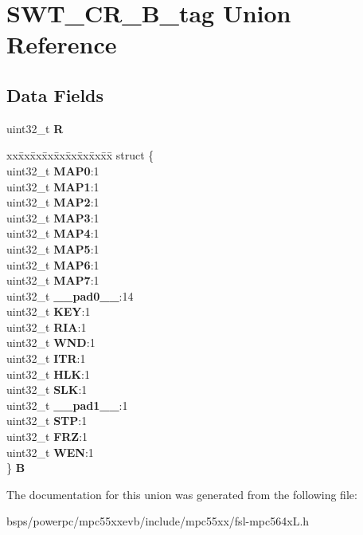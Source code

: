 \hypertarget{unionSWT__CR__32B__tag}{}\section{S\+W\+T\+\_\+\+C\+R\+\_\+B\+\_\+tag Union Reference}
\label{unionSWT__CR__32B__tag}
\subsection*{Data Fields}
\begin{DoxyCompactItemize}
\item 
\mbox{\label{unionSWT__CR__32B__tag_aab82e5accfd13bc4b1583a7394783085}} 
uint32\+\_\+t {\bfseries R}
\item 
\mbox{\label{unionSWT__CR__32B__tag_a6fef1e4d8547604577e510ce1edbcf1a}} 
\begin{tabbing}
xx\=xx\=xx\=xx\=xx\=xx\=xx\=xx\=xx\=\kill
struct \{\\
\>uint32\_t {\bfseries MAP0}:1\\
\>uint32\_t {\bfseries MAP1}:1\\
\>uint32\_t {\bfseries MAP2}:1\\
\>uint32\_t {\bfseries MAP3}:1\\
\>uint32\_t {\bfseries MAP4}:1\\
\>uint32\_t {\bfseries MAP5}:1\\
\>uint32\_t {\bfseries MAP6}:1\\
\>uint32\_t {\bfseries MAP7}:1\\
\>uint32\_t {\bfseries \_\_pad0\_\_}:14\\
\>uint32\_t {\bfseries KEY}:1\\
\>uint32\_t {\bfseries RIA}:1\\
\>uint32\_t {\bfseries WND}:1\\
\>uint32\_t {\bfseries ITR}:1\\
\>uint32\_t {\bfseries HLK}:1\\
\>uint32\_t {\bfseries SLK}:1\\
\>uint32\_t {\bfseries \_\_pad1\_\_}:1\\
\>uint32\_t {\bfseries STP}:1\\
\>uint32\_t {\bfseries FRZ}:1\\
\>uint32\_t {\bfseries WEN}:1\\
\} {\bfseries B}\\

\end{tabbing}\end{DoxyCompactItemize}


The documentation for this union was generated from the following file\+:\begin{DoxyCompactItemize}
\item 
bsps/powerpc/mpc55xxevb/include/mpc55xx/fsl-\/mpc564x\+L.\+h\end{DoxyCompactItemize}
